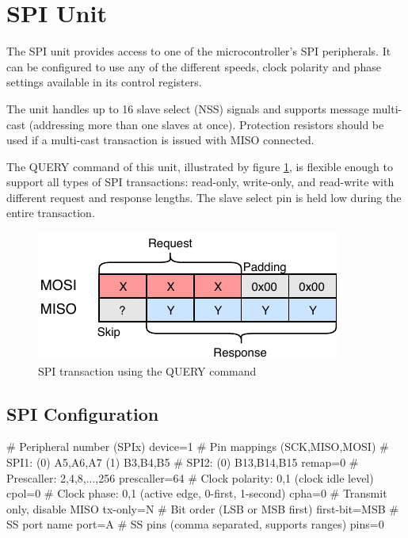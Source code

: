 \section{SPI Unit}

The SPI unit provides access to one of the microcontroller's SPI peripherals. It can be configured to use any of the different speeds, clock polarity and phase settings available in its control registers. 

The unit handles up to 16 slave select (NSS) signals and supports message multi-cast (addressing more than one slaves at once). Protection resistors should be used if a multi-cast transaction is issued with MISO connected.

The QUERY command of this unit, illustrated by figure \ref{fig:spi_query}, is flexible enough to support all types of SPI transactions: read-only, write-only, and read-write with different request and response lengths. The slave select pin is held low during the entire transaction.

\begin{figure}[h]
	\centering
	\includegraphics[scale=1.1] {img/spi-query.pdf}
	\caption{\label{fig:spi_query}SPI transaction using the QUERY command}
\end{figure}

\subsection{SPI Configuration}

\begin{inicode}
# Peripheral number (SPIx)
device=1
# Pin mappings (SCK,MISO,MOSI)
#  SPI1: (0) A5,A6,A7     (1) B3,B4,B5
#  SPI2: (0) B13,B14,B15
remap=0
# Prescaller: 2,4,8,...,256
prescaller=64
# Clock polarity: 0,1 (clock idle level)
cpol=0
# Clock phase: 0,1 (active edge, 0-first, 1-second)
cpha=0
# Transmit only, disable MISO
tx-only=N
# Bit order (LSB or MSB first)
first-bit=MSB
# SS port name
port=A
# SS pins (comma separated, supports ranges)
pins=0
\end{inicode}

